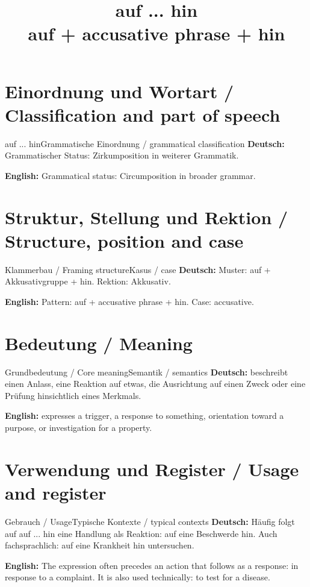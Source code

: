\documentclass[a4paper,11pt]{article}
\title{auf ... hin\\ \large auf + accusative phrase + hin}
\date{}
\newcommand{\GermanText}[1]{\textbf{Deutsch: }#1\par}
\newcommand{\EnglishText}[1]{{\small\color{SoftGray}\textbf{English: }#1\par}}
\begin{document}
\maketitle
\tableofcontents
\newpage
\section{Einordnung und Wortart / Classification and part of speech}
\begin{grammarentry}{auf ... hin}{Grammatische Einordnung / grammatical classification}
\GermanText{Grammatischer Status: Zirkumposition in weiterer Grammatik.}
\EnglishText{Grammatical status: Circumposition in broader grammar.}
\end{grammarentry}
\section{Struktur, Stellung und Rektion / Structure, position and case}
\begin{grammarentry}{Klammerbau / Framing structure}{Kasus / case}
\GermanText{Muster: auf + Akkusativgruppe + hin. Rektion: Akkusativ.}
\EnglishText{Pattern: auf + accusative phrase + hin. Case: accusative.}
\end{grammarentry}
\section{Bedeutung / Meaning}
\begin{grammarentry}{Grundbedeutung / Core meaning}{Semantik / semantics}
\GermanText{beschreibt einen Anlass, eine Reaktion auf etwas, die Ausrichtung auf einen Zweck oder eine Prüfung hinsichtlich eines Merkmals.}
\EnglishText{expresses a trigger, a response to something, orientation toward a purpose, or investigation for a property.}
\end{grammarentry}
\section{Verwendung und Register / Usage and register}
\begin{grammarentry}{Gebrauch / Usage}{Typische Kontexte / typical contexts}
\GermanText{Häufig folgt auf auf ... hin eine Handlung als Reaktion: auf eine Beschwerde hin. Auch fachsprachlich: auf eine Krankheit hin untersuchen.}
\EnglishText{The expression often precedes an action that follows as a response: in response to a complaint. It is also used technically: to test for a disease.}
\end{grammarentry}
\end{document}

